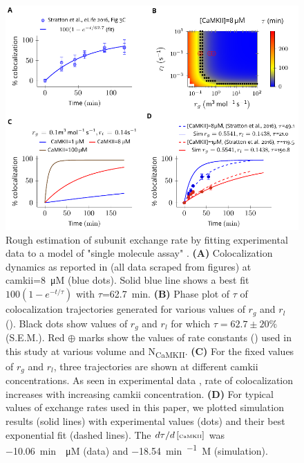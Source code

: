 \documentclass[9pt,lineno,doublespacing]{elife}
\newcommand\SUB[2]{#1\textsubscript{#2}}
\begin{document}
\begin{figure}[ht!]
    \includegraphics[width=0.95\linewidth]{./PaperFigures/elifeFigure8/figure_exchange_rate.pdf}
    \caption{Rough estimation of subunit exchange rate by fitting experimental
        data to a model of "single molecule assay" \cite{stratton_activation-triggered_2014}. 
        \textbf{(A)} Colocalization dynamics as reported in 
        \cite{stratton_activation-triggered_2014} (all data scraped from figures) at
        \gls{camkii}=\SI{8}{\micro M} (blue dots). Solid blue line shows a best
        fit $100(1-e^{-t/\tau})$ with $\tau$=\SI{62.7}{min}. 
        \textbf{(B)} Phase plot of $\tau$ of colocalization trajectories generated 
        for various values of $r_g$ and $r_l$ (). Black dots show values
        of $r_g$ and $r_l$ for which $\tau=62.7\pm 20\%$ (S.E.M.). Red
        $\oplus$ marks show the values of rate constants () 
        used in this study at various volume and \SUB{N}{CaMKII}. 
        \textbf{(C)} For the fixed values of $r_g$ and $r_l$, three trajectories 
        are shown at different \gls{camkii} concentrations. As seen in experimental data
        , rate of colocalization increases with increasing \gls{camkii} concentration. 
        \textbf{(D)} For typical values of exchange rates used in this paper, we plotted
        simulation results (solid lines) with experimental values (dots) and their best
        exponential fit (dashed lines). The ${d\tau}/{d\left[\text{\tiny CaMKII}\right]}$ 
        was \SI{-10.06}{min \per \micro M} (data) and \SI{-18.54}{min\per\micro
        M} (simulation).
    }\label{fig:estimate_of_exchange_rate}
\end{figure}
\end{document}
